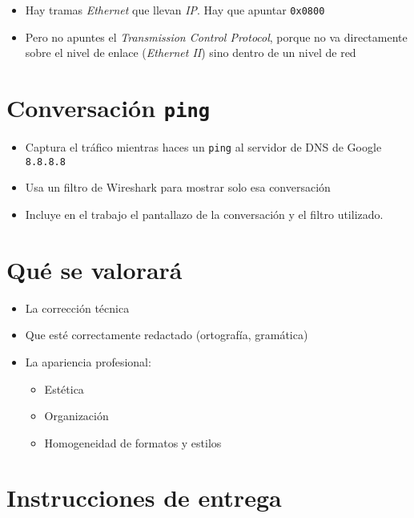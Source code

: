 \documentclass[a4paper]{article}
\begin{document}
\begin{itemize}
\item Hay tramas \emph{Ethernet} que llevan \emph{IP}. Hay que apuntar \texttt{0x0800}
\item Pero no apuntes el \emph{Transmission Control  Protocol}, porque no va directamente sobre el nivel de enlace (\emph{Ethernet II}) sino dentro de un nivel de red
\end{itemize}



\section{Conversación \texttt{ping}}
\label{sec:org0000009}

\begin{itemize}
\item Captura el tráfico mientras haces un \texttt{ping} al servidor de DNS de Google \texttt{8.8.8.8}
\item Usa un filtro de Wireshark para mostrar solo esa conversación
\item Incluye en el trabajo el pantallazo de la conversación y el filtro utilizado.
\end{itemize}




\section{Qué se valorará}
\label{sec:org000000c}


\begin{itemize}
\item La corrección técnica
\item Que esté correctamente redactado (ortografía, gramática)
\item La apariencia profesional:
\begin{itemize}
\item Estética
\item Organización
\item Homogeneidad de formatos y estilos
\end{itemize}
\end{itemize}



\section{Instrucciones de entrega}
\label{sec:org000000f}
\end{document}
